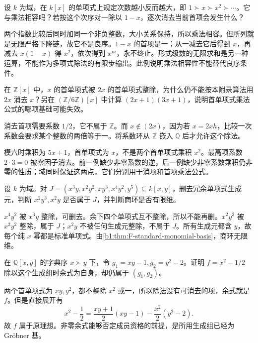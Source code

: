 \begin{exercise}\label{b1:ex:F-nonwell-order}
	设 \(k\) 为域，在 \(k[x]\) 的单项式上规定次数越小反而越大，即 \(1\succ x\succ x^2\succ\cdots\)。它与乘法相容吗？若按这个次序对一除以 \(1-x\)，逐次消去当前首项会发生什么？
\end{exercise}
\begin{solution}
	两个指数比较后同时加同一个非负整数，大小关系保持，所以乘法相容。但所列就是无限严格下降链，故它不是良序。\(1-x\) 的首项是一；从一减去它后得到 \(x\)，再减去 \(x(1-x)\) 得 \(x^2\)，依次得到 \(x^m\)，永不终止。形式级数的无限求和是另一种运算，不能作为多项式除法的有限步输出。此例说明乘法相容性不能替代良序条件。
\end{solution}

\begin{exercise}\label{b1:ex:F-coefficient-field}
	在 \(\mathbb Z[x]\) 中，\(x\) 的首单项式被 \(2x\) 的首单项式整除，为什么仍不能按本附录算法用 \(2x\) 消去 \(x\)？另在 \((\mathbb Z/6\mathbb Z)[x]\) 中计算 \((2x+1)(3x+1)\)，说明首单项式乘法公式的哪项基础可能失效。
\end{exercise}
\begin{solution}
	消去首项需要系数 \(1/2\)，它不属于 \(\mathbb Z\)。而 \(x\notin(2x)\)，因为若 \(x=2xh\)，比较一次系数会要求某个整数的两倍等于一。将系数环从 \(\mathbb Z\) 嵌入 \(\mathbb Q\) 后才允许这个除法。

	模六时乘积为 \(5x+1\)，首单项式为 \(x\)，不是两个首单项式乘积 \(x^2\)。最高项系数 \(2\cdot3=0\) 被零因子消去。前一例缺少非零系数的逆，后一例缺少非零系数乘积仍非零的性质；域同时保证这两点，它们分别用于消项和首项乘法公式。
\end{solution}

\begin{exercise}\label{b1:ex:F-monomial-ideal}
	设 \(k\) 为域。对 \(J=(x^3y,x^2y^2,xy^3,x^4y^2,y^5)\subseteq k[x,y]\)，删去冗余单项式生成元，判断 \(x^2y^3,x^2y\) 是否属于 \(J\)，并判断商环是否有限维。
\end{exercise}
\begin{solution}
	\(x^4y^2\) 被 \(x^3y\) 整除，可删去。余下四个单项式互不整除，所以不能再删。\(x^2y^3\) 被 \(x^2y^2\) 整除，属于 \(J\)；\(x^2y\) 不被任何生成元整除，不属于 \(J\)。所有生成元都含 \(y\)，故每个纯 \(x\) 幂都是标准单项式。由\cref{b1:thm:F-standard-monomial-basis}，商环无限维。
\end{solution}

\begin{exercise}\label{b1:ex:F-nonzero-remainder-member}
	在 \(\mathbb Q[x,y]\) 的字典序 \(x\succ y\) 下，令 \(g_1=xy-1,g_2=y^2-2\)。证明 \(f=x^2-1/2\) 除以这个生成组时余式为自身，却仍属于 \((g_1,g_2)\)。
\end{exercise}
\begin{solution}
	两个首单项式为 \(xy,y^2\)，都不整除 \(x^2\) 或一，所以除法没有可消去的项，余式就是 \(f\)。但是直接展开有
	\[
		x^2-\frac12=\frac{xy+1}{2}(xy-1)-\frac{x^2}{2}(y^2-2).
	\]
	故 \(f\) 属于原理想。非零余式能够否定成员资格的前提，是所用生成组已经为 Gröbner 基。
\end{solution}

